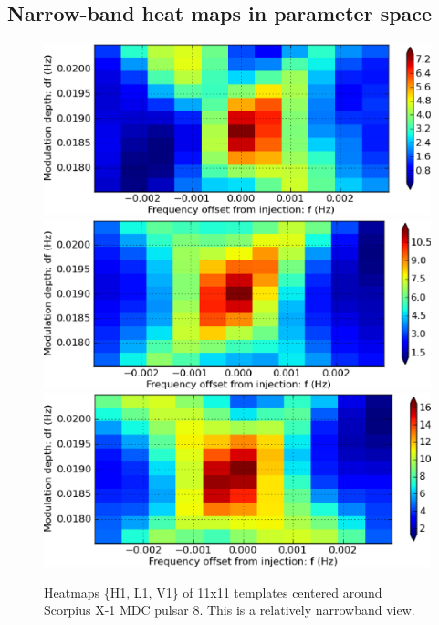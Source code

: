 
\subsection{Narrow-band heat maps in parameter space}


\begin{figure}
\begin{center}
\includegraphics[width=0.6\paperwidth,height=0.2\paperheight]{heatmapH1.eps}
\includegraphics[width=0.6\paperwidth,height=0.2\paperheight]{heatmapL1.eps}
\includegraphics[width=0.6\paperwidth,height=0.2\paperheight]{heatmapV1.eps}
\caption{Heatmaps \{H1, L1, V1\} of 11x11 templates centered around
Scorpius X-1 MDC pulsar 8. 
This is a relatively narrowband view.
}
\end{center}
\end{figure}


